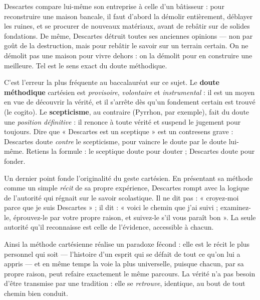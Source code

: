 \documentclass[11pt]{article}
\newcounter{popsec}
\newcounter{popsub}
\newcommand{\courssub}[1]{%
  \stepcounter{popsub}%
  \par\vspace{9pt}\noindent{\popxbold\fontsize{11.5}{13}\selectfont\color{popink}{\color{poporange}\thepopsec.\thepopsub}\hspace{6pt}#1}\par\nopagebreak\vspace{4pt}
}
\begin{document}
\begin{exemplebox}
Descartes compare lui-même son entreprise à celle d'un bâtisseur : pour reconstruire une maison bancale, il faut d'abord la démolir entièrement, déblayer les ruines, et se procurer de nouveaux matériaux, avant de rebâtir sur de solides fondations. De même, Descartes détruit toutes ses anciennes opinions — non par goût de la destruction, mais pour rebâtir le savoir sur un terrain certain. On ne démolit pas une maison pour vivre dehors : on la démolit pour en construire une meilleure. Tel est le sens exact du doute méthodique.
\end{exemplebox}

\begin{attention}
C'est l'erreur la plus fréquente au baccalauréat sur ce sujet. Le \textbf{doute méthodique} cartésien est \emph{provisoire}, \emph{volontaire} et \emph{instrumental} : il est un moyen en vue de découvrir la vérité, et il s'arrête dès qu'un fondement certain est trouvé (le cogito). Le \textbf{scepticisme}, au contraire (Pyrrhon, par exemple), fait du doute une \emph{position définitive} : il renonce à toute vérité et suspend le jugement pour toujours. Dire que « Descartes est un sceptique » est un contresens grave : Descartes doute \emph{contre} le scepticisme, pour vaincre le doute par le doute lui-même. Retiens la formule : le sceptique doute pour douter ; Descartes doute pour fonder.
\end{attention}

\courssub{Une méthode personnelle et universelle}

Un dernier point fonde l'originalité du geste cartésien. En présentant sa méthode comme un simple \emph{récit} de sa propre expérience, Descartes rompt avec la logique de l'autorité qui régnait sur le savoir scolastique. Il ne dit pas : « croyez-moi parce que je suis Descartes » ; il dit : « voici le chemin que j'ai suivi ; examinez-le, éprouvez-le par votre propre raison, et suivez-le s'il vous paraît bon ». La seule autorité qu'il reconnaisse est celle de l'évidence, accessible à chacun.

Ainsi la méthode cartésienne réalise un paradoxe fécond : elle est le récit le plus personnel qui soit — l'histoire d'un esprit qui se défait de tout ce qu'on lui a appris — et en même temps la voie la plus universelle, puisque chacun, par sa propre raison, peut refaire exactement le même parcours. La vérité n'a pas besoin d'être transmise par une tradition : elle se \emph{retrouve}, identique, au bout de tout chemin bien conduit.
\end{document}
